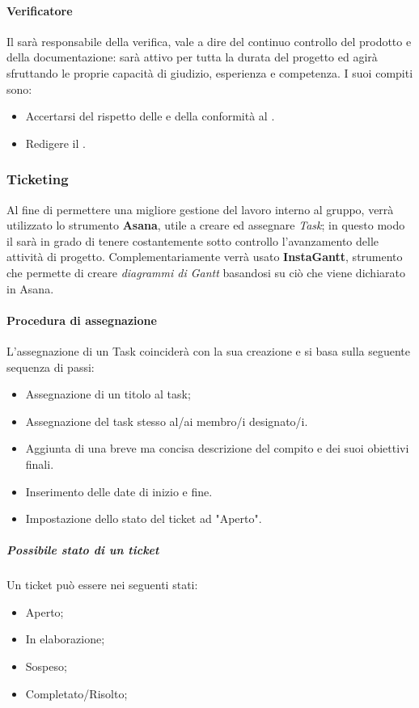 \paragraph{Verificatore}
Il \ver{} sarà responsabile della verifica, vale a dire del continuo controllo del prodotto e della documentazione: sarà attivo per tutta la durata del progetto ed agirà sfruttando le proprie capacità di giudizio, esperienza e competenza. I suoi compiti sono:
\begin{itemize}
\item Accertarsi del rispetto delle \NdP{} e della conformità al \PdQ{}.
\item Redigere il \PdQ{}.
\end{itemize}

\subsubsection{Ticketing}
Al fine di permettere una migliore gestione del lavoro interno al gruppo, verrà utilizzato lo strumento \textbf{Asana}, utile a creare ed assegnare \emph{Task}; in questo modo il \RdP  sarà in grado di tenere costantemente sotto controllo l'avanzamento delle attività di progetto. Complementariamente verrà usato \textbf{InstaGantt}, strumento che permette di creare \emph{diagrammi di Gantt} basandosi su ciò che viene dichiarato in Asana.
\paragraph{Procedura di assegnazione}
L'assegnazione di un Task coinciderà con la sua creazione e si basa sulla seguente sequenza di passi:
\begin{itemize}
\item Assegnazione di un titolo al task;
\item Assegnazione del task stesso al/ai membro/i designato/i.
\item Aggiunta di una breve ma concisa descrizione del compito e dei suoi obiettivi finali.
\item Inserimento delle date di inizio e fine.
\item Impostazione dello stato del ticket ad "Aperto".
\end{itemize}

\subparagraph{Possibile stato di un ticket}
Un ticket può essere nei seguenti stati:
\begin{itemize}
\item Aperto;
\item In elaborazione;
\item Sospeso;
\item Completato/Risolto;
\end{itemize}

